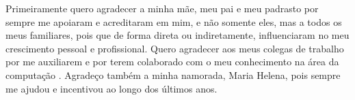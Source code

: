 Primeiramente quero agradecer a minha mãe, meu pai e meu padrasto por sempre me apoiaram e acreditaram em mim, e não somente eles, mas a todos os meus familiares, pois que de forma direta ou indiretamente, influenciaram no meu crescimento pessoal e profissional. Quero agradecer aos meus colegas de trabalho por me auxiliarem e por terem colaborado com o meu conhecimento na área da computação . Agradeço também a minha namorada, Maria Helena, pois sempre me ajudou e incentivou ao longo dos últimos anos.